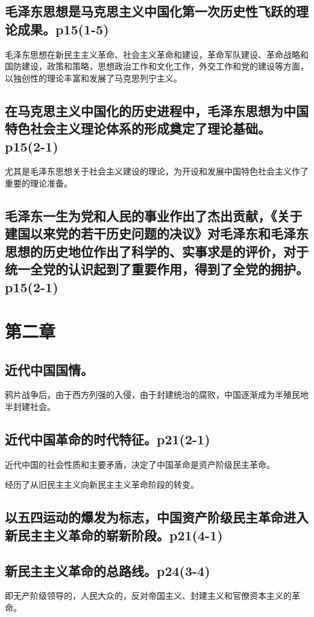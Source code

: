 \documentclass[UTF8]{ctexart}
\begin{document}
\subsection{毛泽东思想是马克思主义中国化第一次历史性飞跃的理论成果。p15(1-5)}
毛泽东思想在新民主主义革命、社会主义革命和建设，革命军队建设、革命战略和国防建设，政策和策略，思想政治工作和文化工作，外交工作和党的建设等方面，以独创性的理论丰富和发展了马克思列宁主义。
\subsection{在马克思主义中国化的历史进程中，毛泽东思想为中国特色社会主义理论体系的形成奠定了理论基础。p15(2-1)}
\par 尤其是毛泽东思想关于社会主义建设的理论，为开设和发展中国特色社会主义作了重要的理论准备。
\subsection{毛泽东一生为党和人民的事业作出了杰出贡献，《关于建国以来党的若干历史问题的决议》对毛泽东和毛泽东思想的历史地位作出了科学的、实事求是的评价，对于统一全党的认识起到了重要作用，得到了全党的拥护。p15(2-1)}
\section{第二章}
\subsection{近代中国国情。}
\par 鸦片战争后，由于西方列强的入侵，由于封建统治的腐败，中国逐渐成为半殖民地半封建社会。
\subsection{近代中国革命的时代特征。p21(2-1)}
\par 近代中国的社会性质和主要矛盾，决定了中国革命是资产阶级民主革命。
\par 经历了从旧民主主义向新民主主义革命阶段的转变。
\subsection{以五四运动的爆发为标志，中国资产阶级民主革命进入新民主主义革命的崭新阶段。p21(4-1)}
\subsection{新民主主义革命的总路线。p24(3-4)}
\par 即无产阶级领导的，人民大众的，反对帝国主义、封建主义和官僚资本主义的革命。
\end{document}
